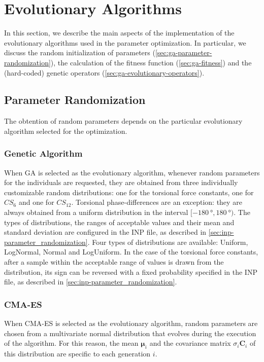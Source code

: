 \documentclass[10pt,a4paper,openany]{memoir}
\numberwithin{equation}{section}
\begin{document}
\section{Evolutionary Algorithms}
\label{sec:ga}

In this section, we describe the main aspects of the implementation of
the evolutionary algorithms used in the parameter optimization.  In
particular, we discuss the random initialization of parameters
(\autoref{sec:ga-parameter-randomization}), the calculation of the
fitness function (\autoref{sec:ga-fitness}) and the (hard-coded)
genetic operators (\autoref{sec:ga-evolutionary-operators}).

\subsection{Parameter Randomization}
\label{sec:ga-parameter-randomization}

The obtention of random parameters depends on the particular
evolutionary algorithm selected for the optimization.

\subsubsection{Genetic Algorithm}

When GA is selected as the evolutionary algorithm, whenever random
parameters for the individuals are requested, they are obtained from
three individually customizable random distributions: one for the
torsional force constants, one for $CS_6$ and one for $CS_{12}$.
Torsional phase-differences are an exception: they are always obtained
from a uniform distribution in the interval $[\SI{-180}{\degree},
\SI{180}{\degree})$.  The types of distributions, the ranges of
acceptable values and their mean and standard deviation are configured
in the INP file, as described in
\autoref{sec:inp-parameter_randomization}.  Four types of
distributions are available: Uniform, LogNormal, Normal and
LogUniform. In the case of the torsional force constants, after a
sample within the acceptable range of values is drawn from the
distribution, its sign can be reversed with a fixed probability
specified in the INP file, as described in
\autoref{sec:inp-parameter_randomization}.

\subsubsection{CMA-ES}

When CMA-ES is selected as the evolutionary algorithm, random
parameters are chosen from a multivariate normal distribution that
evolves during the execution of the algorithm. For this reason, the
mean $\boldsymbol{\mu}_i$ and the covariance matrix
$\sigma_i \boldsymbol{C}_i$ of this distribution are specific to each
generation $i$.
\end{document}
